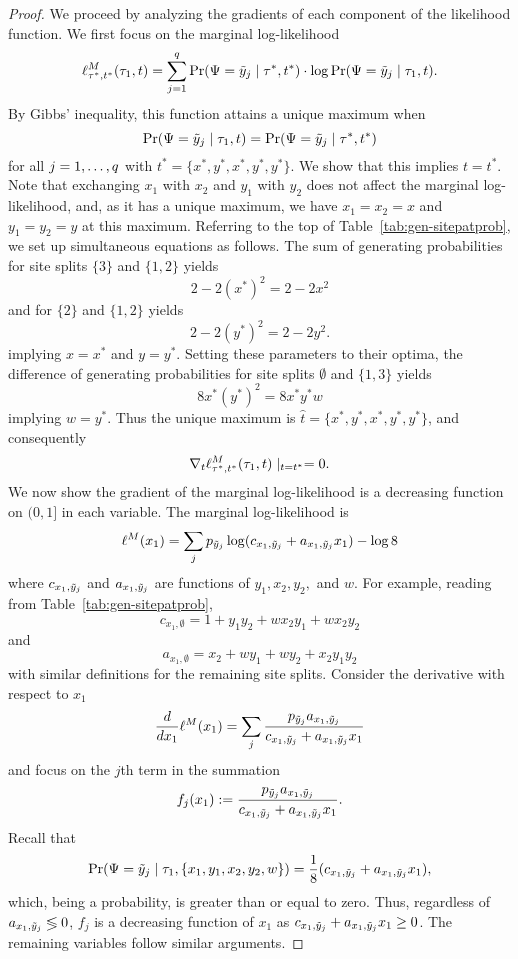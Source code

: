 \begin{proof}
We proceed by analyzing the gradients of each component of the likelihood function.
We first focus on the marginal log-likelihood
\[
\ell^M_{\tau^*,t^*}(\tau_1,t) = \sum_{j=1}^q \Pr(\Psi=\tilde{y}_j \mid \tau^*, t^*) \cdot \log \Pr(\Psi=\tilde{y}_j \mid \tau_1, t).
\]
By Gibbs' inequality, this function attains a unique maximum when
\[
\Pr(\Psi=\tilde{y}_j \mid \tau_1, t) = \Pr(\Psi=\tilde{y}_j \mid \tau^*, t^*)
\]
for all $j=1,\ldots,q$ with $t^*=\{x^*,y^*,x^*,y^*,y^*\}$.
We show that this implies $t=t^*$.
Note that exchanging $x_1$ with $x_2$ and $y_1$ with $y_2$ does not affect the marginal log-likelihood, and, as it has a unique maximum, we have $x_1=x_2=x$ and $y_1=y_2=y$ at this maximum.
Referring to the top of Table~\ref{tab:gen-sitepatprob}, we set up simultaneous equations as follows.
The sum of generating probabilities for site splits $\{3\}$ and $\{1,2\}$ yields
\[
2-2(x^*)^2 = 2-2x^2
\]
and for $\{2\}$ and $\{1,2\}$ yields
\[
2-2(y^*)^2 = 2-2y^2.
\]
implying $x=x^*$ and $y=y^*$.
Setting these parameters to their optima, the difference of generating probabilities for site splits $\emptyset$ and $\{1,3\}$ yields
\[
8x^*(y^*)^2 = 8x^*y^*w
\]
implying $w=y^*$.
Thus the unique maximum is $\hat{t}=\{x^*,y^*,x^*,y^*,y^*\}$, and consequently
\[
\nabla_t \ell^M_{\tau^*,t^*}(\tau_1,t) \mid_{t=t^*} = 0.
\]
We now show the gradient of the marginal log-likelihood is a decreasing function on $(0,1]$ in each variable.
The marginal log-likelihood is
\begin{align*}
\ell^M(x_1) = \sum_j p_{\tilde{y}_j} \log(c_{x_1,\tilde{y}_j} + a_{x_1,\tilde{y}_j}x_1) - \log 8
\end{align*}
where $c_{x_1,\tilde{y}_j}$ and $a_{x_1,\tilde{y}_j}$ are functions of $y_1,x_2,y_2,$ and $w$.
For example, reading from Table~\ref{tab:gen-sitepatprob},
\[
c_{x_1,\emptyset} = 1+y_1y_2+wx_2y_1+wx_2y_2
\]
and
\[
a_{x_1,\emptyset} = x_2+wy_1+wy_2+x_2y_1y_2
\]
with similar definitions for the remaining site splits.
Consider the derivative with respect to $x_1$
\begin{align*}
\frac{d}{dx_1} \ell^M(x_1) = \sum_j \frac{p_{\tilde{y}_j}a_{x_1,\tilde{y}_j}}{c_{x_1,\tilde{y}_j} + a_{x_1,\tilde{y}_j}x_1}
\end{align*}
and focus on the $j$th term in the summation
\[
f_j(x_1) := \frac{p_{\tilde{y}_j}a_{x_1,\tilde{y}_j}}{c_{x_1,\tilde{y}_j} + a_{x_1,\tilde{y}_j}x_1}.
\]
Recall that
\[
\Pr(\Psi=\tilde{y}_j \mid \tau_1,\{x_1,y_1,x_2,y_2,w\}) = \frac{1}{8} (c_{x_1,\tilde{y}_j} + a_{x_1,\tilde{y}_j}x_1),
\]
which, being a probability, is greater than or equal to zero.
Thus, regardless of $a_{x_1,\tilde{y}_j} \lessgtr 0$, $f_j$ is a decreasing function of $x_1$ as $c_{x_1,\tilde{y}_j} + a_{x_1,\tilde{y}_j}x_1 \ge 0$.
The remaining variables follow similar arguments.


\end{proof}
